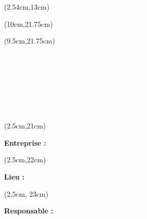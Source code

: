 \begin{titlepage}
    \begin{textblock*}{16cm}(2.54cm,13cm)
        {
            \normalsize
            \makeatletter
            \setlength{\parindent}{0pt}
            \titletext
        }
    \end{textblock*}

    \begin{textblock*}{9cm}(10cm,21.75cm)
        \normalsize
        \centering
        \textbf{\textcolor{white}{Mots clés (cf Thésaurus)}}
    \end{textblock*}

    \begin{textblock*}{10cm}(9.5cm,21.75cm)
        \small
        \textcolor{white}{
            \begin{itemize}[label=\textcolor{white}{\textbullet}]
                \item \textbf{\theKone}
                \item \textbf{\theKtwo}
                \item \textbf{\theKthree}
                \item \textbf{\theKfourth}
            \end{itemize}
        }
    \end{textblock*}

    \begin{textblock*}{6.5cm}(2.5cm,21cm)
        \small
        \raggedright
        \justify
        \textbf{\textcolor{bleuRoiUTT}{Entreprise :} \theEntreprise}
    \end{textblock*}

    \begin{textblock*}{6.5cm}(2.5cm,22cm)
        \small
        \raggedright
        \justify
        \textbf{\textcolor{bleuRoiUTT}{Lieu :} \textit{\mapAddr{\theLieu}}}
    \end{textblock*}

    \begin{textblock*}{6.5cm}(2.5cm, 23cm)
        \small
        \raggedright
        \justify
        \textbf{\textcolor{bleuRoiUTT}{Responsable :} \theREntre}
    \end{textblock*}

\end{titlepage}

\clearpage %